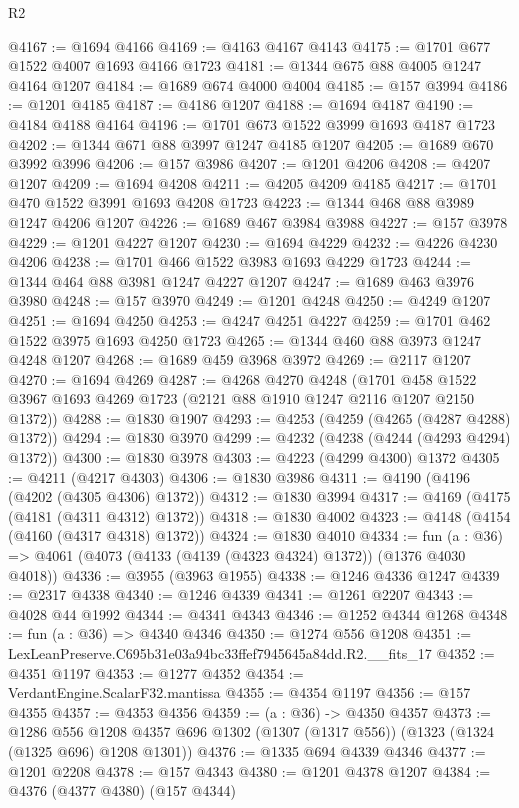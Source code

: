 \begin{lexlean}{R2}
\begin{coremodule}
@4167 := @1694 @4166
@4169 := @4163 @4167 @4143
@4175 := @1701 @677 @1522 @4007 @1693 @4166 @1723
@4181 := @1344 @675 @88 @4005 @1247 @4164 @1207
@4184 := @1689 @674 @4000 @4004
@4185 := @157 @3994
@4186 := @1201 @4185
@4187 := @4186 @1207
@4188 := @1694 @4187
@4190 := @4184 @4188 @4164
@4196 := @1701 @673 @1522 @3999 @1693 @4187 @1723
@4202 := @1344 @671 @88 @3997 @1247 @4185 @1207
@4205 := @1689 @670 @3992 @3996
@4206 := @157 @3986
@4207 := @1201 @4206
@4208 := @4207 @1207
@4209 := @1694 @4208
@4211 := @4205 @4209 @4185
@4217 := @1701 @470 @1522 @3991 @1693 @4208 @1723
@4223 := @1344 @468 @88 @3989 @1247 @4206 @1207
@4226 := @1689 @467 @3984 @3988
@4227 := @157 @3978
@4229 := @1201 @4227 @1207
@4230 := @1694 @4229
@4232 := @4226 @4230 @4206
@4238 := @1701 @466 @1522 @3983 @1693 @4229 @1723
@4244 := @1344 @464 @88 @3981 @1247 @4227 @1207
@4247 := @1689 @463 @3976 @3980
@4248 := @157 @3970
@4249 := @1201 @4248
@4250 := @4249 @1207
@4251 := @1694 @4250
@4253 := @4247 @4251 @4227
@4259 := @1701 @462 @1522 @3975 @1693 @4250 @1723
@4265 := @1344 @460 @88 @3973 @1247 @4248 @1207
@4268 := @1689 @459 @3968 @3972
@4269 := @2117 @1207
@4270 := @1694 @4269
@4287 := @4268
    @4270
    @4248
    (@1701 @458 @1522 @3967 @1693 @4269 @1723 (@2121 @88 @1910 @1247 @2116 @1207 @2150 @1372))
@4288 := @1830 @1907
@4293 := @4253 (@4259 (@4265 (@4287 @4288) @1372))
@4294 := @1830 @3970
@4299 := @4232 (@4238 (@4244 (@4293 @4294) @1372))
@4300 := @1830 @3978
@4303 := @4223 (@4299 @4300) @1372
@4305 := @4211 (@4217 @4303)
@4306 := @1830 @3986
@4311 := @4190 (@4196 (@4202 (@4305 @4306) @1372))
@4312 := @1830 @3994
@4317 := @4169 (@4175 (@4181 (@4311 @4312) @1372))
@4318 := @1830 @4002
@4323 := @4148 (@4154 (@4160 (@4317 @4318) @1372))
@4324 := @1830 @4010
@4334 := fun (a : @36) => @4061 (@4073 (@4133 (@4139 (@4323 @4324) @1372)) (@1376 @4030 @4018))
@4336 := @3955 (@3963 @1955)
@4338 := @1246 @4336 @1247
@4339 := @2317 @4338
@4340 := @1246 @4339
@4341 := @1261 @2207
@4343 := @4028 @44 @1992
@4344 := @4341 @4343
@4346 := @1252 @4344 @1268
@4348 := fun (a : @36) => @4340 @4346
@4350 := @1274 @556 @1208
@4351 := LexLeanPreserve.C695b31e03a94bc33ffef7945645a84dd.R2.__fits_17
@4352 := @4351 @1197
@4353 := @1277 @4352
@4354 := VerdantEngine.ScalarF32.mantissa
@4355 := @4354 @1197
@4356 := @157 @4355
@4357 := @4353 @4356
@4359 := (a : @36) -> @4350 @4357
@4373 := @1286
    @556
    @1208
    @4357
    @696
    @1302
    (@1307 (@1317 @556))
    (@1323 (@1324 (@1325 @696) @1208 @1301))
@4376 := @1335 @694 @4339 @4346
@4377 := @1201 @2208
@4378 := @157 @4343
@4380 := @1201 @4378 @1207
@4384 := @4376 (@4377 @4380) (@157 @4344)

\end{coremodule}
\end{lexlean}
